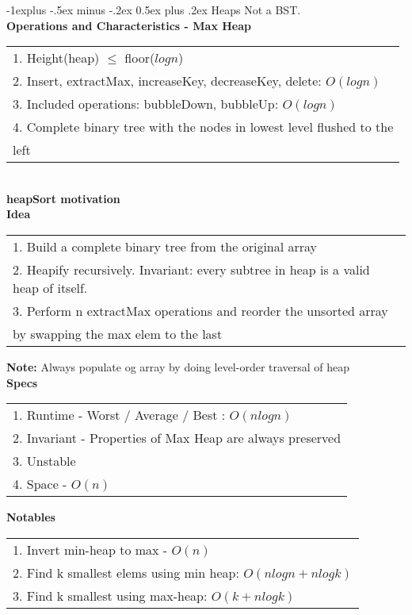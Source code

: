 \documentclass[10pt,landscape]{article}
\makeatletter
\renewcommand{\subsection}{\@startsection{subsection}{2}{0mm}%
                                {-1explus -.5ex minus -.2ex}%
                                {0.5ex plus .2ex}%
                                {\normalfont\normalsize\bfseries}}
\makeatother
\begin{document}
\begin{multicols}{3}
\subsection{Heaps} 
Not a BST. \\
\textbf{Operations and Characteristics - Max Heap} \\
\begin{tabular}{l} 
1. Height(heap) $\leq$ floor($logn$) \\ 
2. Insert, extractMax, increaseKey, decreaseKey, delete: $O(logn)$ \\
3. Included operations: bubbleDown, bubbleUp: $O(logn)$ \\ 
4. Complete binary tree with the nodes in lowest level flushed to the \\ left 
\end{tabular} \\
\textbf{heapSort motivation} \\
\textbf{Idea} 
\begin{tabular}{l} 
1. Build a complete binary tree from the original array \\ 
2. Heapify recursively. Invariant: every subtree in heap is a valid heap of itself. \\ 
3. Perform n extractMax operations and reorder the unsorted array \\ by swapping the max elem to the last \\ 
\end{tabular}\textbf{}
\textbf{Note:} Always populate og array by doing level-order traversal of heap \\
\textbf{Specs} \\ 
\begin{tabular}{l} 
1. Runtime - Worst / Average / Best : $O(nlogn)$ \\ 
2. Invariant - Properties of Max Heap are always preserved \\ 
3. Unstable \\
4. Space - $O(n)$
\end{tabular} 
\textbf{Notables} \\ 
\begin{tabular}{l} 
1. Invert min-heap to max - $O(n)$ \\
2. Find k smallest elems using min heap: $O(nlogn + nlogk)$ \\ 
3. Find k smallest using max-heap: $O(k + nlogk)$
\end{tabular}


\end{multicols}
\end{document}
